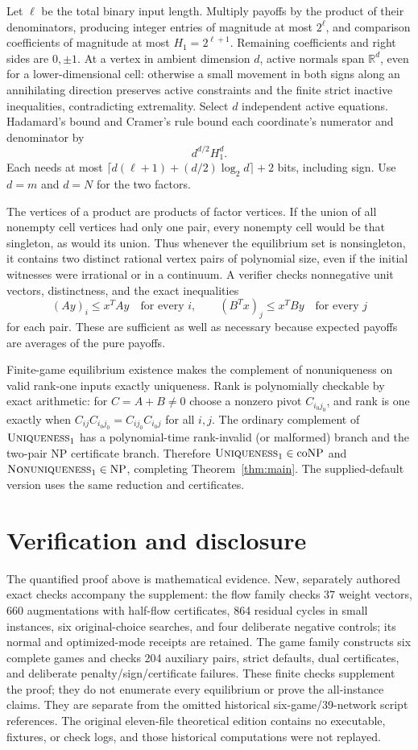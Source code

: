 \documentclass[11pt]{article}
\theoremstyle{remark}\newtheorem{remark}[theorem]{Remark}
\newcommand{\R}{\mathbb R}
\newcommand{\UNIQ}{\textsc{Uniqueness}_1}
\newcommand{\NON}{\textsc{Nonuniqueness}_1}
\begin{document}
Let $\ell$ be the total binary input length. Multiply payoffs by the product of their denominators, producing integer entries of magnitude at most $2^\ell$, and comparison coefficients of magnitude at most $H_1=2^{\ell+1}$. Remaining coefficients and right sides are $0,\pm1$. At a vertex in ambient dimension $d$, active normals span $\R^d$, even for a lower-dimensional cell: otherwise a small movement in both signs along an annihilating direction preserves active constraints and the finite strict inactive inequalities, contradicting extremality. Select $d$ independent active equations. Hadamard's bound and Cramer's rule bound each coordinate's numerator and denominator by
\[
 d^{d/2}H_1^d.
\]
Each needs at most $\lceil d(\ell+1)+(d/2)\log_2d\rceil+2$ bits, including sign. Use $d=m$ and $d=N$ for the two factors.

The vertices of a product are products of factor vertices. If the union of all nonempty cell vertices had only one pair, every nonempty cell would be that singleton, as would its union. Thus whenever the equilibrium set is nonsingleton, it contains two distinct rational vertex pairs of polynomial size, even if the initial witnesses were irrational or in a continuum. A verifier checks nonnegative unit vectors, distinctness, and the exact inequalities
\[
 (Ay)_i\le x^TAy\quad\text{for every }i,\qquad
 (B^Tx)_j\le x^TBy\quad\text{for every }j
\]
for each pair. These are sufficient as well as necessary because expected payoffs are averages of the pure payoffs.

Finite-game equilibrium existence \cite{nash} makes the complement of nonuniqueness on valid rank-one inputs exactly uniqueness. Rank is polynomially checkable by exact arithmetic: for $C=A+B\ne0$ choose a nonzero pivot $C_{i_0j_0}$, and rank is one exactly when $C_{ij}C_{i_0j_0}=C_{ij_0}C_{i_0j}$ for all $i,j$. The ordinary complement of $\UNIQ$ has a polynomial-time rank-invalid (or malformed) branch and the two-pair NP certificate branch. Therefore $\UNIQ\in\mathrm{coNP}$ and $\NON\in\mathrm{NP}$, completing Theorem~\ref{thm:main}. The supplied-default version uses the same reduction and certificates.

\section{Verification and disclosure}
The quantified proof above is mathematical evidence. New, separately authored exact checks accompany the supplement: the flow family checks 37 weight vectors, 660 augmentations with half-flow certificates, 864 residual cycles in small instances, six original-choice searches, and four deliberate negative controls; its normal and optimized-mode receipts are retained. The game family constructs six complete games and checks 204 auxiliary pairs, strict defaults, dual certificates, and deliberate penalty/sign/certificate failures. These finite checks supplement the proof; they do not enumerate every equilibrium or prove the all-instance claims. They are separate from the omitted historical six-game/39-network script references. The original eleven-file theoretical edition contains no executable, fixtures, or check logs, and those historical computations were not replayed.
\end{document}
